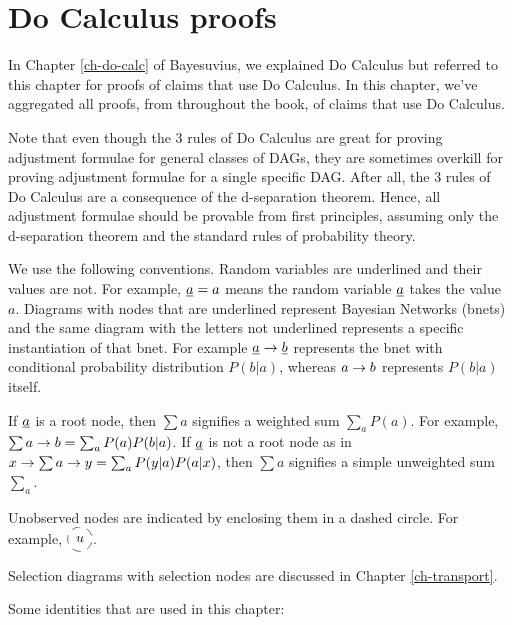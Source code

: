 \chapter{Do Calculus proofs}
\label{ch-do-calc-proofs}

In Chapter \ref{ch-do-calc}
of Bayesuvius,
we explained Do Calculus
but referred to this
chapter for proofs
of claims that
use Do Calculus.
In this chapter, we've
aggregated
 all proofs, from
throughout the book,
of claims that use Do Calculus.

Note that even though the 3
rules of Do Calculus
are great for proving
adjustment formulae
for general classes of DAGs,
they are sometimes overkill
for proving
 adjustment formulae
for a single specific DAG.
After all,  the
 3 rules of Do Calculus
are a consequence
of the d-separation theorem.
Hence, all adjustment
formulae should be
provable from first principles,
assuming only
the d-separation theorem
and the standard rules of
probability theory.

We use the
 following conventions.
Random variables are underlined
and their values are not.
For example, ${\underline{a}}=a$ means
the random variable
${\underline{a}}$ takes the value $a$.
Diagrams
with nodes that are
underlined represent
Bayesian Networks (bnets)
and the same diagram
with the letters not underlined
represents a specific
instantiation of that bnet.
For example ${\underline{a}}\rightarrow{\underline{b}}$
represents the bnet with
conditional probability distribution
$P(b|a)$,
whereas  $a\rightarrow b$
represents $P(b|a)$ itself.

If ${\underline{a}}$ is a root node,
then $\sum a$ signifies
a weighted sum $\sum_a P(a)$.
For example, $\sum a\rightarrow b=\sum_a P(a)P(b|a)$.
If ${\underline{a}}$ is not
a root node
as in $x\rightarrow\sum a \rightarrow y=
\sum_a P(y|a)P(a|x) $, then
$\sum a$ signifies
a simple unweighted sum $\sum_a$.

Unobserved nodes are
indicated by enclosing them
in a dashed circle. For example,
$\xymatrix{*++[F-o]{u}}$.

Selection diagrams
with selection nodes 
 are discussed 
in Chapter \ref{ch-transport}.
\selectionGraphs

Some identities
that are used in this chapter:

